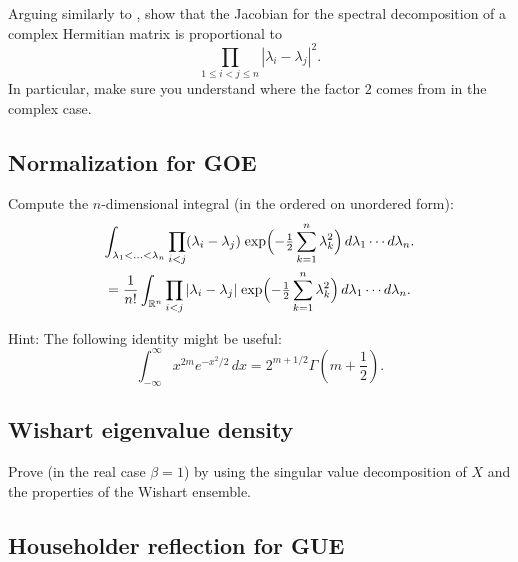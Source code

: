 \documentclass[letterpaper,11pt,oneside,reqno]{article}
\numberwithin{equation}{section}
\newcommand{\ssp}{\hspace{1pt}}
\theoremstyle{definition}
\begin{document}
Arguing similarly to
,
show that the Jacobian for the spectral decomposition
of a complex Hermitian matrix is proportional to
\begin{equation*}
	\prod_{1\le i<j\le n}|\lambda_i-\lambda_j|^2.
\end{equation*}
In particular, make sure you understand
where the factor $2$ comes from in the complex case.

\subsection{Normalization for GOE}
\label{prob:GOE-normalization}

Compute the $n$-dimensional integral
(in the ordered on unordered form):
\begin{multline*}
	\int_{\lambda_1<\ldots<\lambda_n } \prod_{i<j}(\lambda_i-\lambda_j)
	\ssp
	\exp\Bigl(-\tfrac{1}{2}\sum_{k=1}^n \lambda_k^2\Bigr)\,d\lambda_1\cdots d\lambda_n.\\=
	\frac{1}{n!}
	\int_{\mathbb{R}^n}
	\prod_{i<j}|\lambda_i-\lambda_j|\ssp
	\exp\Bigl(-\tfrac{1}{2}\sum_{k=1}^n \lambda_k^2\Bigr)\,d\lambda_1\cdots d\lambda_n.
\end{multline*}

\medskip
\noindent
Hint: The following identity might be useful:
\[
\int_{-\infty}^{\infty} x^{2m} e^{-x^2/2} \, dx = 2^{m+1/2} \Gamma \left( m + \frac{1}{2} \right).
\]


\subsection{Wishart eigenvalue density}

Prove  (in the real case $\beta=1$)
by using the singular
value
decomposition
of \(X\) and the properties of the Wishart ensemble.

\subsection{Householder reflection for GUE}
\end{document}
